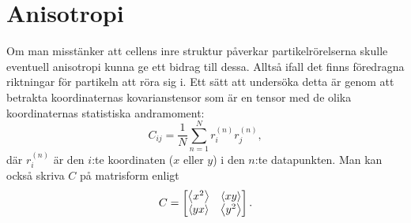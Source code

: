 \begin{comment} %
\section{Spektraltäthet och brushantering}
Ett annat verktyg för att undersöka partilarnas rörelser är att titta på vad för spektraläthet partiklarnas position har. Spektraltätheten erhålls genom att ta Fouriertransformen av partikelns position som funktion av tid. På så sätt erhålls ett mått på hur mycket av varje frekvens som finns. Detta kan vara användbart på flera olika sätt; bland annat ger det ett annat sätt att \todo{Jag vet fortfarande inte hur man gör här}ta fram hur MSD:n beter sig, men spektraltätheten kan också användas för att 

Om man 
\begin{equation}
\hat{x} = x + \sigma\eta
\end{equation}


\todo[inline]{Mer kommer sen.}

Ett annat sätt att upptäcka bruset i en mätning är att titta på 


\subsection{Resultat}


\end{comment}


\section{Anisotropi}
Om man misstänker att cellens inre struktur påverkar partikelrörelserna skulle eventuell anisotropi kunna ge ett bidrag till dessa. Alltså ifall det finns föredragna riktningar för partikeln att röra sig i. Ett sätt att undersöka detta är genom att betrakta koordinaternas kovarianstensor som är en tensor med de olika koordinaternas statistiska andramoment:
\begin{equation}
C_{ij} = \frac{1}{N} \sum_{n=1}^{N} r_i^{(n)}r_j^{(n)},
\end{equation}
där $r_i^{(n)}$ är den $i$:te koordinaten ($x$ eller $y$) i den $n$:te datapunkten. Man kan också skriva $C$ på matrisform enligt
\begin{equation}
C=
\begin{bmatrix} \label{eq:C_matrix}
\ev{x^2} & \ev{xy}\\
\ev{yx} & \ev{y^2}
\end{bmatrix}.
\end{equation}


